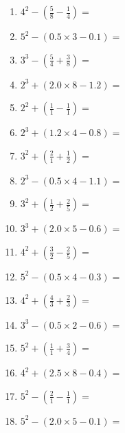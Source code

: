 \documentclass[12pt]{article}
\begin{document}
\begin{enumerate}
\item \large $ 4^{2} - (\frac{5}{8} - \frac{1}{4}) = $ \vspace{1.6cm}
\item \large $ 5^{2} - (0.5 \times 3 - 0.1) = $ \vspace{1.6cm}
\item \large $ 3^{3} - (\frac{5}{4} + \frac{3}{8}) = $ \vspace{1.6cm}
\item \large $ 2^{3} + (2.0 \times 8 - 1.2) = $ \vspace{1.6cm}
\newpage
\item \large $ 2^{2} + (\frac{1}{1} - \frac{1}{1}) = $ \vspace{1.6cm}
\item \large $ 2^{3} + (1.2 \times 4 - 0.8) = $ \vspace{1.6cm}
\item \large $ 3^{2} + (\frac{2}{1} + \frac{1}{2}) = $ \vspace{1.6cm}
\item \large $ 2^{3} - (0.5 \times 4 - 1.1) = $ \vspace{1.6cm}
\item \large $ 3^{2} + (\frac{1}{2} + \frac{2}{5}) = $ \vspace{1.6cm}
\item \large $ 3^{3} + (2.0 \times 5 - 0.6) = $ \vspace{1.6cm}
\item \large $ 4^{2} + (\frac{3}{2} - \frac{2}{5}) = $ \vspace{1.6cm}
\item \large $ 5^{2} - (0.5 \times 4 - 0.3) = $ \vspace{1.6cm}
\item \large $ 4^{2} + (\frac{4}{3} + \frac{2}{3}) = $ \vspace{1.6cm}
\item \large $ 3^{3} - (0.5 \times 2 - 0.6) = $ \vspace{1.6cm}
\newpage
\item \large $ 5^{2} + (\frac{1}{1} + \frac{3}{4}) = $ \vspace{1.6cm}
\item \large $ 4^{2} + (2.5 \times 8 - 0.4) = $ \vspace{1.6cm}
\item \large $ 5^{2} - (\frac{2}{1} - \frac{1}{1}) = $ \vspace{1.6cm}
\item \large $ 5^{2} - (2.0 \times 5 - 0.1) = $ \vspace{1.6cm}

\end{enumerate}
\end{document}
